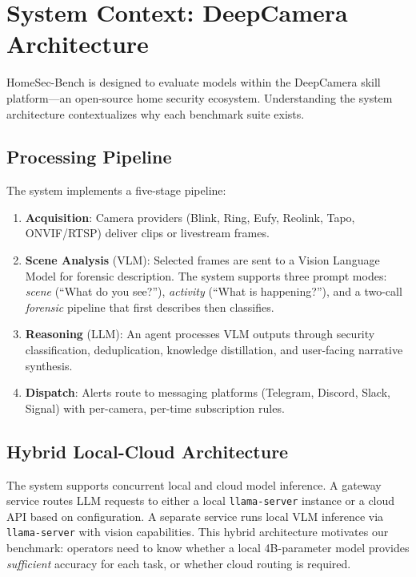 \documentclass[onecolumn,10pt]{IEEEtran}
\begin{document}

\section{System Context: DeepCamera Architecture}

HomeSec-Bench is designed to evaluate models within the DeepCamera
skill platform---an open-source home security ecosystem. Understanding
the system architecture contextualizes why each benchmark suite exists.

\subsection{Processing Pipeline}
The system implements a five-stage pipeline:

\begin{enumerate}[nosep]
    \item \textbf{Acquisition}: Camera providers (Blink, Ring, Eufy, Reolink,
    Tapo, ONVIF/RTSP) deliver clips or livestream frames.
    \item \textbf{Scene Analysis} (VLM): Selected frames are sent to a
    Vision Language Model for forensic description. The system supports
    three prompt modes: \emph{scene} (``What do you see?''),
    \emph{activity} (``What is happening?''), and a two-call
    \emph{forensic} pipeline that first describes then classifies.
    \item \textbf{Reasoning} (LLM): An agent processes VLM outputs
    through security classification, deduplication, knowledge
    distillation, and user-facing narrative synthesis.
    \item \textbf{Dispatch}: Alerts route to messaging platforms
    (Telegram, Discord, Slack, Signal) with per-camera, per-time
    subscription rules.
\end{enumerate}

\subsection{Hybrid Local-Cloud Architecture}
The system supports concurrent local and cloud model inference. A
gateway service routes LLM requests to either a local
\texttt{llama-server} instance or a cloud API based on configuration.
A separate service runs local VLM inference via \texttt{llama-server}
with vision capabilities. This hybrid architecture motivates our
benchmark: operators need to know whether a local 4B-parameter model
provides \emph{sufficient} accuracy for each task, or whether cloud
routing is required.
\end{document}
